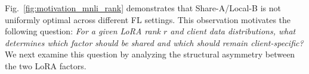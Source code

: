 \documentclass[lettersize,journal]{IEEEtran}
\begin{document}
	Fig.~\ref{fig:motivation_mnli_rank} demonstrates that Share-A/Local-B is not uniformly optimal across different FL settings. This observation motivates the following question: 
	{\color{black}\textit{For a given LoRA rank $r$ and client data distributions, what determines which factor should be shared and which should remain client-specific?}}
	We next examine this question by analyzing the structural asymmetry between the two LoRA factors.
	
	
	
	
	
		
\end{document}
